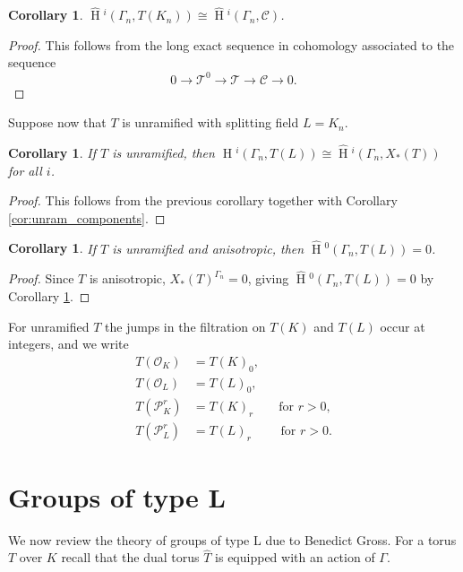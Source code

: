 \documentclass{compositio}
\theoremstyle{plain}
\newtheorem{corollary}[theorem]{Corollary}
\newcommand{\HT}[1]{\hat{\HH}{}^{#1}}
\theoremstyle{definition}
\DeclareMathOperator{\HH}{H}
\newcommand{\TT}{\mathcal{T}}
\newcommand{\C}{\mathcal{C}}
\newcommand{\OK}{\mathcal{O}_K}
\newcommand{\PK}{\mathcal{P}_K}
\newcommand{\PL}{\mathcal{P}_L}
\newcommand{\OL}{\mathcal{O}_L}
\begin{document}
\begin{corollary}
$\HT{i}(\Gamma_n, T(K_n)) \cong \HT{i}(\Gamma_n, \C)$.
\end{corollary}

\begin{proof}
This follows from the long exact sequence in cohomology associated to the sequence
$$0 \rightarrow \TT^0 \rightarrow \TT \rightarrow \C \rightarrow 0.$$
\end{proof}

Suppose now that $T$ is unramified with splitting field $L = K_n$.

\begin{corollary} \label{cor:cohom_tori}
If $T$ is unramified, then $\HT{i}(\Gamma_n, T(L)) \cong \HT{i}(\Gamma_n, X_*(T))$
for all $i$.
\end{corollary}

\begin{proof}
This follows from the previous corollary together with Corollary \ref{cor:unram_components}.
\end{proof}

\begin{corollary}\label{cor:vanishing_H0}
If $T$ is unramified and anisotropic, then $\HT{0}(\Gamma_n, T(L)) = 0$.
\end{corollary}

\begin{proof}
Since $T$ is anisotropic, $X_*(T)^{\Gamma_n} = 0$, giving $\HT{0}(\Gamma_n, T(L)) = 0$ by Corollary
\ref{cor:cohom_tori}.
\end{proof}

For unramified $T$ the jumps in the filtration on $T(K)$ and $T(L)$ occur at integers, and we write
\begin{align*}
T(\OK) &= T(K)_0, \\
T(\OL) &= T(L)_0, \\
T(\PK^r) &= T(K)_r\qquad \mbox{for $r > 0$}, \\
T(\PL^r) &= T(L)_r\qquad\,\,\mbox{for $r > 0$}.
\end{align*}

\section{Groups of type L} \label{section:groups_of_type_L}

We now review the theory of groups of type L due to Benedict
Gross.  For a torus $T$ over $K$ recall that the dual torus $\hat{T}$ is equipped with
an action of $\Gamma$.
\end{document}
